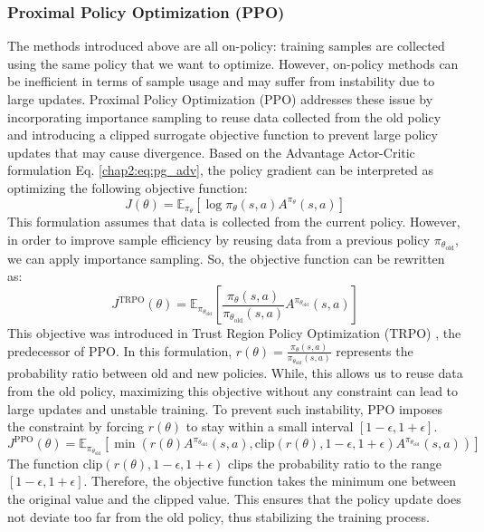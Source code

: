 \subsubsection{Proximal Policy Optimization (PPO)}

The methods introduced above are all on-policy: training samples are collected using the same policy that we want to optimize.
However, on-policy methods can be inefficient in terms of sample usage and may suffer from instability due to large updates.
Proximal Policy Optimization (PPO) \cite{PPO} addresses these issue by incorporating importance sampling to reuse data collected from the old policy and introducing a clipped surrogate objective function to prevent large policy updates that may cause divergence.
Based on the Advantage Actor-Critic formulation Eq. \ref{chap2:eq:pg_adv}, the policy gradient can be interpreted as optimizing the following objective function:
\begin{equation}
  J(\theta) = \mathbb{E}_{\pi_\theta}[\log \pi_\theta(s, a) A^{\pi_\theta}(s, a)]
\end{equation}
This formulation assumes that data is collected from the current policy.  
However, in order to improve sample efficiency by reusing data from a previous policy $\pi_{\theta_\text{old}}$, we can apply importance sampling.
So, the objective function can be rewritten as:
\begin{equation}
  J^{\text{TRPO}}(\theta) = \mathbb{E}_{\pi_{\theta_\text{old}}} \left[ \frac{\pi_\theta (s, a)}{\pi_{\theta_\text{old}}(s, a)}A^{\pi_{\theta_\text{old}}}(s, a) \right]
\end{equation}
This objective was introduced in Trust Region Policy Optimization (TRPO) \cite{TRPO}, the predecessor of PPO.
In this formulation, $r(\theta) = \frac{\pi_\theta (s, a)}{\pi_{\theta_\text{old}}(s, a)}$ represents the probability ratio between old and new policies.
While, this allows us to reuse data from the old policy, maximizing this objective without any constraint can lead to large updates and unstable training.
To prevent such instability, PPO imposes the constraint by forcing $r(\theta)$ to stay within a small interval $[1 - \epsilon, 1 + \epsilon]$.
\begin{equation}
  J^{\text{PPO}}(\theta) = \mathbb{E}_{\pi_{\theta_\text{old}}} \left[ \min \left( r(\theta) A^{\pi_{\theta_\text{old}}}(s, a), \text{clip}(r(\theta), 1 - \epsilon, 1 + \epsilon) A^{\pi_{\theta_\text{old}}}(s, a) \right) \right]
\end{equation}
The function $\text{clip}(r(\theta), 1 - \epsilon, 1 + \epsilon)$ clips the probability ratio to the range $[1 - \epsilon, 1 + \epsilon]$.
Therefore, the objective function takes the minimum one between the original value and the clipped value.
This ensures that the policy update does not deviate too far from the old policy, thus stabilizing the training process.


